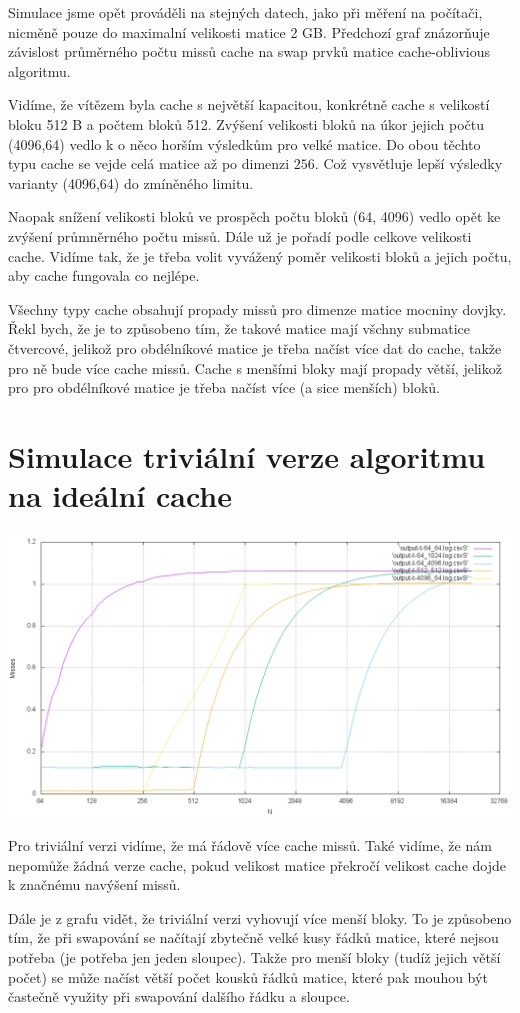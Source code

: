 \documentclass[12pt,a4paper]{report}
\begin{document}
Simulace jsme opět prováděli na stejných datech, jako při měření 
na počítači, nicměně pouze do maximalní velikosti matice 2 GB.
Předchozí graf znázorňuje závislost průměrného počtu missů cache na swap prvků matice cache-oblivious algoritmu.

Vidíme, že vítězem byla cache s největší kapacitou, konkrétně cache s velikostí bloku 512 B
a počtem bloků 512. Zvýšení velikosti bloků na úkor jejich počtu (4096,64) vedlo k o něco horším výsledkům pro velké matice.
Do obou těchto typu cache se vejde celá matice až po dimenzi $256$. Což vysvětluje lepší výsledky varianty (4096,64)
do zmíněného limitu.


Naopak snížení velikosti bloků ve prospěch počtu bloků (64, 4096) vedlo opět ke zvýšení průmněrného počtu missů. 
Dále už je pořadí podle celkove velikosti cache. Vidíme tak, že je třeba volit vyvážený poměr
velikosti bloků a jejich počtu, aby cache fungovala co nejlépe.

Všechny typy cache obsahují propady missů pro dimenze matice mocniny dovjky.
Řekl bych, že je to způsobeno tím, že takové matice mají všchny submatice čtvercové,
jelikož pro obdélníkové matice je třeba načíst více dat do cache, takže pro ně
bude více cache missů. Cache s menšími bloky mají propady větší, jelikož pro pro 
obdélníkové matice je třeba načíst více (a sice menších) bloků. 


\section{Simulace triviální verze algoritmu na ideální cache}
\includegraphics[width=\textwidth]{./tests/graph3.png}

Pro triviální verzi vidíme, že má řádově více cache missů. Také vidíme,
že nám nepomůže žádná verze cache, pokud velikost matice překročí velikost cache dojde 
k značnému navýšení missů.

Dále je z grafu vidět, že triviální verzi vyhovují více 
menší bloky. To je způsobeno tím, že při swapování se načítají zbytečně velké kusy řádků
matice, které nejsou potřeba (je potřeba jen jeden sloupec). Takže pro menší bloky (tudíž jejich větší počet) se může
načíst větší počet kousků řádků matice, které pak mouhou být častečně využity při swapování
dalšího řádku a sloupce. 

  
\end{document}
